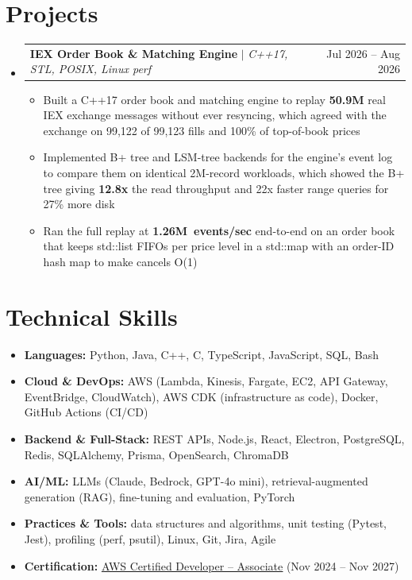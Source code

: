 \documentclass[letterpaper,10pt]{article}
\makeatletter
\newcommand{\resumeItem}[1]{\item{#1}\vspace{-1pt}}
\newcommand{\resumeProjectHeading}[2]{%
  \item
  \begin{tabular*}{\textwidth}{l@{\extracolsep{\fill}}r}
    #1 & #2 \\
  \end{tabular*}\vspace{-6pt}%
}
\newcommand{\resumeSubHeadingListStart}{\begin{itemize}[leftmargin=0in, label={}, itemsep=0pt, topsep=2pt]}
\newcommand{\resumeSubHeadingListEnd}{\end{itemize}}
\newcommand{\resumeItemListStart}{\begin{itemize}[leftmargin=0.18in, itemsep=0pt, topsep=1pt, parsep=0pt]}
\newcommand{\resumeItemListEnd}{\end{itemize}\vspace{0pt}}
\makeatother
\begin{document}
\section{Projects}
\resumeSubHeadingListStart
  \resumeProjectHeading
    {\textbf{IEX Order Book \& Matching Engine} $|$ \textit{C++17, STL, POSIX, Linux perf}}{Jul 2026 -- Aug 2026}
  \resumeItemListStart
    \resumeItem{Built a C++17 order book and matching engine to replay \textbf{50.9M} real IEX exchange messages without ever resyncing, which agreed with the exchange on 99,122 of 99,123 fills and 100\% of top-of-book prices}
    \resumeItem{Implemented B+ tree and LSM-tree backends for the engine's event log to compare them on identical 2M-record workloads, which showed the B+ tree giving \textbf{12.8x} the read throughput and 22x faster range queries for 27\% more disk}
    \resumeItem{Ran the full replay at \mbox{\textbf{1.26M events/sec}} end-to-end on an order book that keeps std::list FIFOs per price level in a std::map with an order-ID hash map to make cancels O(1)}
  \resumeItemListEnd
\resumeSubHeadingListEnd

\section{Technical Skills}
\begin{itemize}[leftmargin=0in, label={}, itemsep=0pt, topsep=2pt]
  \small
  \item{\textbf{Languages:} Python, Java, C++, C, TypeScript, JavaScript, SQL, Bash}
  \item{\textbf{Cloud \& DevOps:} AWS (Lambda, Kinesis, Fargate, EC2, API Gateway, EventBridge, CloudWatch), AWS CDK (infrastructure as code), Docker, GitHub Actions (CI/CD)}
  \item{\textbf{Backend \& Full-Stack:} REST APIs, Node.js, React, Electron, PostgreSQL, Redis, SQLAlchemy, Prisma, OpenSearch, ChromaDB}
  \item{\textbf{AI/ML:} LLMs (Claude, Bedrock, GPT-4o mini), retrieval-augmented generation (RAG), fine-tuning and evaluation, PyTorch}
  \item{\textbf{Practices \& Tools:} data structures and algorithms, unit testing (Pytest, Jest), profiling (perf, psutil), Linux, Git, Jira, Agile}
  \item{\textbf{Certification:} \href{https://www.credly.com/badges/d2406a97-d937-47de-823b-724981159d3b/public_url}{\underline{AWS Certified Developer -- Associate}} (Nov 2024 -- Nov 2027)}
\end{itemize}
\end{document}
